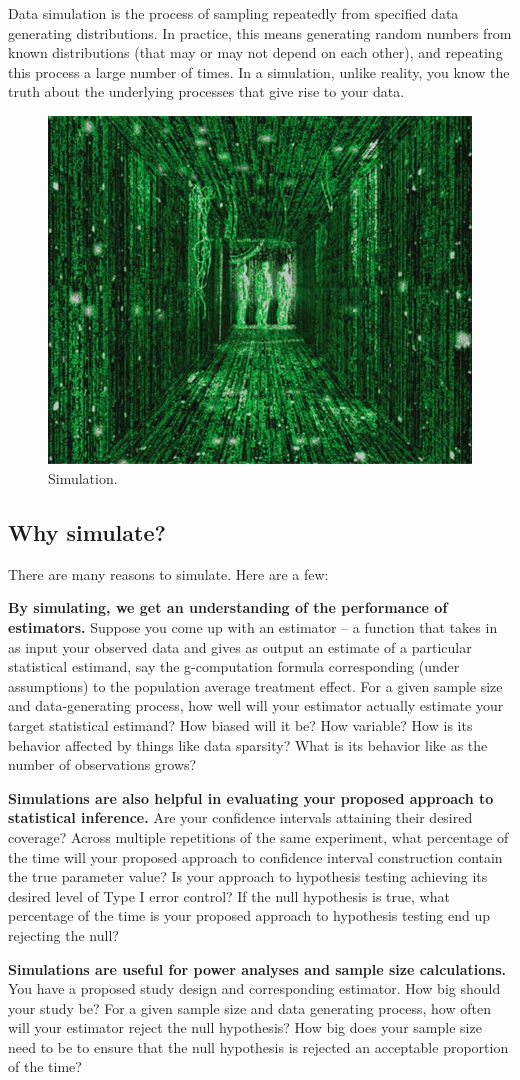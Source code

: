 \documentclass{exam}
\newenvironment{packed_enum}{
\begin{enumerate}
 \setlength{\itemsep}{0pt}
  \setlength{\parskip}{0pt}
  \setlength{\parsep}{0pt}
}{\end{enumerate}}
\begin{document}
Data simulation is the process of sampling repeatedly from specified data generating distributions. In practice, this means generating random numbers from known distributions (that may or may not depend on each other), and repeating this process a large number of times. In a simulation, unlike reality, you know the truth about the underlying processes that give rise to your data.

\begin{figure}
\begin{center}
\includegraphics[width=.4\textwidth]{matrixsim.jpg}
\caption{Simulation.}
\end{center}
\end{figure}

\subsection{Why simulate?}
There are many reasons to simulate. Here are a few:
\begin{packed_enum}
\item \textbf{By simulating, we get an understanding of the performance of estimators.} Suppose you come up with an estimator -- a function that takes in as input your observed data and gives as output an estimate of a particular statistical estimand, say the g-computation formula corresponding (under assumptions) to the population average treatment effect. For a given sample size and data-generating process, how well will your estimator actually estimate your target statistical estimand? How biased will it be? How variable? How is its behavior affected by things like data sparsity? What is its behavior like as the number of observations grows?  
\item \textbf{Simulations are also helpful in evaluating your proposed approach to statistical inference.} Are your confidence intervals attaining their desired coverage? Across multiple repetitions of the same experiment, what percentage of the time will your proposed approach to confidence interval construction contain the true parameter value? Is your approach to hypothesis testing achieving its desired level of Type I error control? If the null hypothesis is true, what percentage of the time is your proposed approach to hypothesis testing end up rejecting the null?
\item \textbf{Simulations are useful for power analyses and sample size calculations.} You have a proposed study design and corresponding estimator. How big should your study be? For a given sample size and data generating process, how often will your estimator reject the null hypothesis? How big does your sample size need to be to ensure that the null hypothesis is rejected an acceptable proportion of the time? 
\end{packed_enum}
\end{document}
